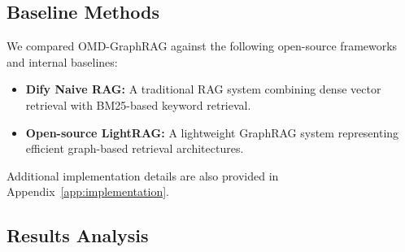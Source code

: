 \documentclass[11pt]{article}
\begin{document}
\subsection{Baseline Methods}

We compared OMD-GraphRAG against the following open-source frameworks and internal baselines:

\begin{itemize}[nosep]
    \item \textbf{Dify Naive RAG:} A traditional RAG system combining dense vector retrieval with BM25-based keyword retrieval.
    \item \textbf{Open-source LightRAG:} \citep{4} A lightweight GraphRAG system representing efficient graph-based retrieval architectures.
\end{itemize}


Additional implementation details are also provided in Appendix~\ref{app:implementation}.


\subsection{Results Analysis}
\end{document}
